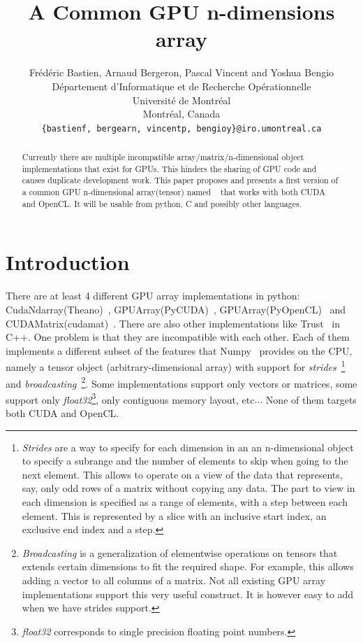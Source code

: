 \documentclass{article} %
\title{A Common GPU n-dimensions array}
\author{
Frédéric Bastien, Arnaud Bergeron, Pascal Vincent and Yoshua Bengio \\
D\'epartement d'Informatique et de Recherche Op\'erationnelle\\
Universit\'e de Montr\'eal\\
Montr\'eal, Canada \\
\texttt{\{bastienf, bergearn, vincentp, bengioy\}@iro.umontreal.ca} \\
}
\begin{document}
\maketitle

\begin{abstract}
Currently there are multiple incompatible array/matrix/n-dimensional object implementations that exist for GPUs. 
This hinders the sharing of GPU code and causes duplicate development work.
This paper proposes and presents a first version of a common GPU n-dimensional array(tensor) named ~\citep{GpuNdArray} that works with both CUDA and OpenCL. 
It will be usable from python, C and possibly other languages.
\end{abstract}

\section{Introduction}
There are at least 4 different GPU array implementations in
python: CudaNdarray(Theano)~\citep{bergstra+al:2010-scipy},
GPUArray(PyCUDA)~\citep{kloeckner_pycuda_2009},
GPUArray(PyOpenCL)~\citep{kloeckner_pycuda_2009} and
CUDAMatrix(cudamat)~\citep{cudamat-TR2009}. 
There are also other implementations like Trust~\citep{Thrust} in C++. 
One problem is that they are incompatible with each other. 
Each of them implements a different subset of the features that Numpy~\citep{numpy-2007} provides on the CPU, namely a tensor object (arbitrary-dimensional array) with support for \emph{strides}~\footnote{
\emph{Strides} are a way to specify for each dimension in an an n-dimensional object to specify a subrange and the number of elements to skip when going
to the next element. 
This allows to operate on a view of the data that represents, say, only odd rows of a matrix without copying any data.
The part to view in each dimension is specified as a range of elements, with a step between each element.
This is represented by a slice with an inclusive start index, an exclusive end index and a step.
}
and \emph{broadcasting}~\footnote{
\emph{Broadcasting} is a generalization of elementwise operations on tensors that extends certain dimensions to fit the required shape.
For example, this allows adding a vector to all columns of a matrix.
Not all existing GPU array implementations support this very useful construct.
It is however easy to add when we have strides support.
}.
Some implementations support only vectors or matrices, some support only \emph{float32}\footnote{
\emph{float32} corresponds to single precision floating point numbers.
}, only contiguous memory layout, etc$\ldots$
None of them targets both CUDA and OpenCL.
\end{document}
